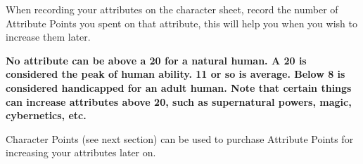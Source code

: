 \documentclass[twoside]{book}
\begin{document}
 When recording your attributes on the character
               sheet, record the number of Attribute Points you spent on
               that attribute, this will help you when you wish to
               increase them later. 

 \textbf{ No attribute can be above a 20 for a natural human.
               A 20 is considered the peak of human ability. 11 or so is
               average. Below 8 is considered handicapped for an adult
               human. Note that certain things can increase attributes
               above 20, such as supernatural powers, magic, cybernetics,
               etc. }

 Character Points (see next section) can be used to
               purchase Attribute Points for increasing your attributes
               later on. 
    
\end{document}
